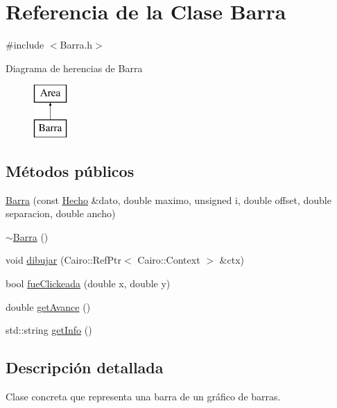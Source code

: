 \hypertarget{classBarra}{\section{\-Referencia de la \-Clase \-Barra}
\label{classBarra}
}


{\ttfamily \#include $<$\-Barra.\-h$>$}

\-Diagrama de herencias de \-Barra\begin{figure}[H]
\begin{center}
\leavevmode
\includegraphics[height=2.000000cm]{classBarra}
\end{center}
\end{figure}
\subsection*{\-Métodos públicos}
\begin{DoxyCompactItemize}
\item 
\hyperlink{classBarra_a8edaf9bde1490cb349c50a1665c32193}{\-Barra} (const \hyperlink{classHecho}{\-Hecho} \&dato, double maximo, unsigned i, double offset, double separacion, double ancho)
\item 
\hyperlink{classBarra_a0d8469e11d2382e0808879f4f500062f}{$\sim$\-Barra} ()
\item 
void \hyperlink{classBarra_af5dc4f34b2441270ad906de2d8a745d0}{dibujar} (\-Cairo\-::\-Ref\-Ptr$<$ \-Cairo\-::\-Context $>$ \&ctx)
\item 
bool \hyperlink{classBarra_a5d04d0e7c196327c0b58409c7854d5ca}{fue\-Clickeada} (double x, double y)
\item 
double \hyperlink{classBarra_a705b42ca3d507c0f02786065c889f199}{get\-Avance} ()
\item 
std\-::string \hyperlink{classBarra_a5d8b121357bdeec02ab3cf46e95b740c}{get\-Info} ()
\end{DoxyCompactItemize}


\subsection{\-Descripción detallada}
\-Clase concreta que representa una barra de un gráfico de barras. 


